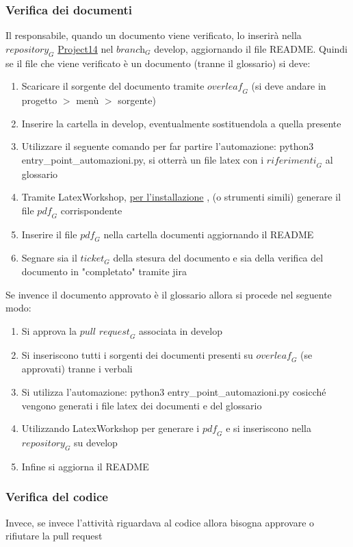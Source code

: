 \subsubsection{Verifica dei documenti}
Il responsabile, quando un documento viene verificato, lo inserirà nella $\textit{repository}_G$ \href{https://github.com/RAMtastic6/Project14}{Project14} nel $\textit{branch}_G$ develop, aggiornando il file README.
Quindi se il file che viene verificato è un documento (tranne il glossario) si deve:
\begin{enumerate}
    \item Scaricare il sorgente del documento tramite $\textit{overleaf}_G$ (si deve andare in progetto $>$ menù $>$ sorgente)
    \item Inserire la cartella in develop, eventualmente sostituendola a quella presente
    \item Utilizzare il seguente comando per far partire l'automazione: python3 entry\_point\_automazioni.py, si otterrà un file latex con i $\textit{riferimenti}_G$ al glossario
    \item Tramite LatexWorkshop, \href{https://github.com/James-Yu/LaTeX-Workshop/wiki/Install}{per l'installazione} , (o strumenti simili) generare il file $\textit{pdf}_G$ corrispondente
    \item Inserire il file $\textit{pdf}_G$ nella cartella documenti aggiornando il README
    \item Segnare sia il $\textit{ticket}_G$ della stesura del documento e sia della verifica del documento in "completato" tramite jira
\end{enumerate}
Se invence il documento approvato è il glossario allora si procede nel seguente modo:
\begin{enumerate}
    \item Si approva la $\textit{pull request}_G$ associata in develop
    \item Si inseriscono tutti i sorgenti dei documenti presenti su $\textit{overleaf}_G$ (se approvati) tranne i verbali
    \item Si utilizza l'automazione: python3 entry\_point\_automazioni.py
    cosicché vengono generati i file latex dei documenti e del glossario
    \item Utilizzando LatexWorkshop per generare i $\textit{pdf}_G$ e si inseriscono nella $\textit{repository}_G$ su develop
    \item Infine si aggiorna il README
\end{enumerate}
\subsubsection{Verifica del codice}
Invece, se invece l'attività riguardava al codice allora bisogna approvare o rifiutare la pull request
